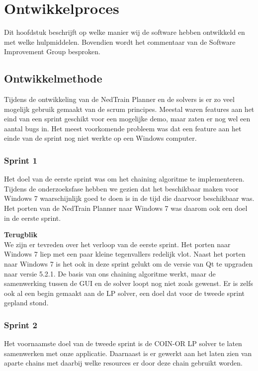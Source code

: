 \section{Ontwikkelproces}
Dit hoofdstuk beschrijft op welke manier wij de software hebben ontwikkeld en met welke hulpmiddelen. Bovendien wordt het commentaar van de Software Improvement Group besproken.

\subsection{Ontwikkelmethode}
Tijdens de ontwikkeling van de NedTrain Planner en de solvers is er zo veel mogelijk gebruik gemaakt van de scrum principes. Meestal waren features aan het eind van een sprint geschikt voor een mogelijke demo, maar zaten er nog wel een aantal bugs in. Het meest voorkomende probleem was dat een feature aan het einde van de sprint nog niet werkte op een Windows computer.

\subsubsection{Sprint 1}
Het doel van de eerste sprint was om het chaining algoritme te implementeren. Tijdens de onderzoeksfase hebben we gezien dat het beschikbaar maken voor Windows 7 waarschijnlijk goed te doen is in de tijd die daarvoor beschikbaar was. Het porten van de NedTrain Planner naar Windows 7 was daarom ook een doel in de eerste sprint. 

\textbf{Terugblik} \\
We zijn er tevreden over het verloop van de eerste sprint. Het porten naar Windows 7 liep met een paar kleine tegenvallers redelijk vlot. Naast het porten naar Windows 7 is het ook in deze sprint gelukt om de versie van Qt te upgraden naar versie 5.2.1. De basis van ons chaining algoritme werkt, maar de samenwerking tussen de GUI en de solver loopt nog niet zoals gewenst. Er is zelfs ook al een begin gemaakt aan de LP solver, een doel dat voor de tweede sprint gepland stond. 

\subsubsection{Sprint 2}
Het voornaamste doel van de tweede sprint is de COIN-OR LP solver te laten samenwerken met onze applicatie. Daarnaast is er gewerkt aan het laten zien van aparte chains met daarbij welke resources er door deze chain gebruikt worden. 

